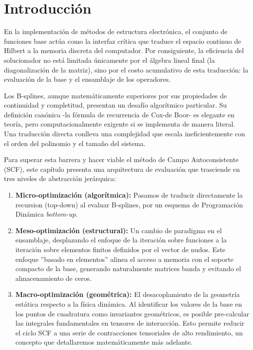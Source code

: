 \section{Introducción}

En la implementación de métodos de estructura electrónica, el conjunto de funciones base actúa como la interfaz crítica que traduce el espacio continuo de Hilbert a la memoria discreta del computador. Por consiguiente, la eficiencia del solucionador no está limitada únicamente por el álgebra lineal final (la diagonalización de la matriz), sino por el costo acumulativo de esta traducción: la evaluación de la base y el ensamblaje de los operadores.

Los B-splines, aunque matemáticamente superiores por sus propiedades de continuidad y completitud, presentan un desafío algorítmico particular. Su definición canónica -la fórmula de recurrencia de Cox-de Boor- es elegante en teoría, pero computacionalmente exigente si se implementa de manera literal. Una traducción directa conlleva una complejidad que escala ineficientemente con el orden del polinomio y el tamaño del sistema.

Para superar esta barrera y hacer viable el método de Campo Autoconsistente (SCF), este capítulo presenta una arquitectura de evaluación que trasciende en tres niveles de abstracción jerárquica:

\begin{enumerate}
\item \textbf{Micro-optimización (algorítmica):} Pasamos de traducir directamente la recursion (top-down) al evaluar B-splines, por un esquema de Programación Dinámica \textit{bottom-up}.
\item \textbf{Meso-optimización (estructural):} Un cambio de paradigma en el ensamblaje, desplazando el enfoque de la iteración sobre funciones a la iteración sobre elementos finitos definidos por el vector de nudos. Este enfoque ”basado en elementos” alinea el acceso a memoria con el soporte compacto de la base, generando naturalmente matrices banda y evitando el almacenamiento de ceros.
\item \textbf{Macro-optimización (geométrica):} El desacoplamiento de la geometría estática respecto a la física dinámica. Al identificar los valores de la base en los puntos de cuadratura como invariantes geométricos, es posible pre-calcular las integrales fundamentales en tensores de interacción. Esto permite reducir el ciclo SCF a una serie de contracciones tensoriales de alto rendimiento, un concepto que detallaremos matemáticamente más adelante.
\end{enumerate}

